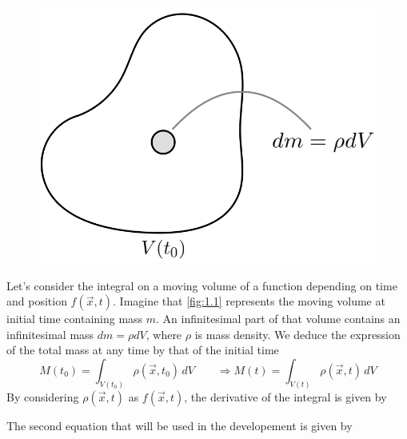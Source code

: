 	\begin{figure}
	\vspace{-5mm}
	\includegraphics[scale=0.3]{ch1/1}
	\label{fig:1.1}
	\end{figure}
	Let's consider the integral on a moving volume of a function depending on time and position $f(\vec{x},t)$. Imagine that \autoref{fig:1.1} represents the moving volume at initial time containing mass $m$. An infinitesimal part of that volume contains an infinitesimal mass $dm = \rho dV$, where $\rho$ is mass density. We deduce the expression of the total mass at any time by that of the initial time  
	\begin{equation}
		M(t_0) = \int _{V(t_0)}\rho (\vec{x},t_0)\, dV \qquad \Rightarrow M(t) = \int _{V(t)}\rho (\vec{x},t)\, dV
	\end{equation}
	By considering $\rho (\vec{x},t)$ as $f(\vec{x},t)$, the derivative of the integral is given by
	
	\begin{center}
	\end{center}
	
	The second equation that will be used in the developement is given by
	\begin{center}
	\end{center}
	
